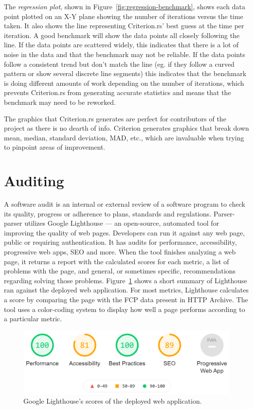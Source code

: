 \documentclass[english,bachelors,forcepolishlogotype]{wizthesis}
\newcommand{\thisproject}{Parser-parser}
\begin{document}
The \emph{regression plot}, shown in Figure~\ref{fig:regression-benchmark},
shows each data point plotted on an X-Y plane showing the number of iterations
versus the time taken. It also shows the line representing Criterion.rs' best
guess at the time per iteration. A good benchmark will show the data points all
closely following the line. If the data points are scattered widely, this
indicates that there is a lot of noise in the data and that the benchmark may
not be reliable. If the data points follow a consistent trend but don't match
the line (eg. if they follow a curved pattern or show several discrete line
segments) this indicates that the benchmark is doing different amounts of work
depending on the number of iterations, which prevents Criterion.rs from
generating accurate statistics and means that the benchmark may need to be
reworked.

The graphics that Criterion.rs generates are perfect for contributors of the
project as there is no dearth of info. Criterion generates graphics that break
down mean, median, standard deviation, MAD, etc., which are invaluable when
trying to pinpoint areas of improvement.

\section{Auditing}

A software audit is an internal or external review of a software program to
check its quality, progress or adherence to plans, standards and regulations.
\thisproject{} utilizes Google Lighthouse --- an open-source, automated tool for
improving the quality of web pages. Developers can run it against any web page,
public or requiring authentication. It has audits for performance,
accessibility, progressive web apps, SEO and more. When the tool finishes
analyzing a web page, it returns a report with the calculated scores for each
metric, a list of problems with the page, and general, or sometimes specific,
recommendations regarding solving those problems.
Figure~\ref{fig:lighthouse-summary} shows a short summary of Lighthouse ran
against the deployed web application. For most metrics, Lighthouse calculates a
score by comparing the page with the FCP data present in HTTP Archive. The tool
uses a color-coding system to display how well a page performs according to a
particular metric.

\begin{figure}[h]
  \centering
  \includegraphics[width=\textwidth]{lighthouse_summary.png}
  \caption{Google Lighthouse's scores of the deployed web application.}
  \label{fig:lighthouse-summary}
\end{figure}
\end{document}
